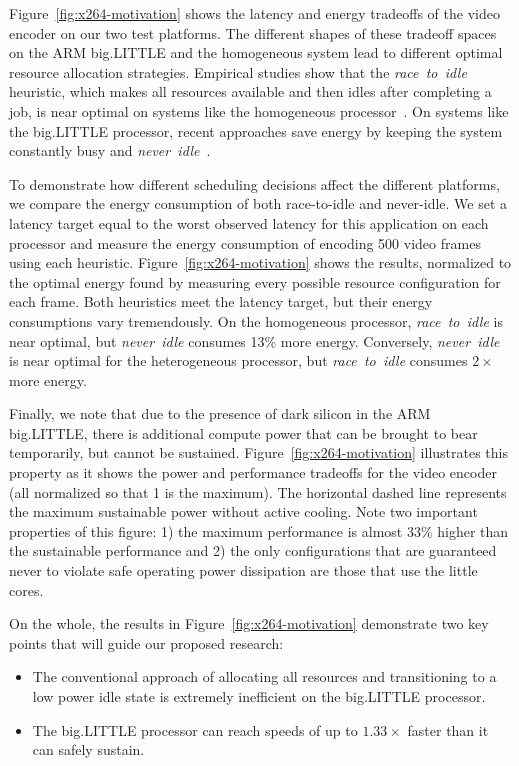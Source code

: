 Figure~\ref{fig:x264-motivation} shows the latency and energy
tradeoffs of the video encoder on our two test platforms.  The
different shapes of these tradeoff spaces on the ARM big.LITTLE and
the homogeneous system lead to different optimal resource allocation
strategies. Empirical studies show that the \emph{race~to~idle}
heuristic, which makes all resources available and then idles after
completing a job, is near optimal on systems like the homogeneous
processor~\cite{PowerSlope,Hoelzle2009,google2,Imes2014,HotPower}.  On
systems like the big.LITTLE processor, recent approaches save energy
by keeping the system constantly busy and
\emph{never~idle}~\cite{Carroll13,LeSueur11,Imes2014,HotPower}.

To demonstrate how different scheduling decisions affect the different
platforms, we compare the energy consumption of both race-to-idle and
never-idle.  We set a latency target equal to the worst observed
latency for this application on each processor and measure the energy
consumption of encoding 500 video frames using each heuristic.
Figure~\ref{fig:x264-motivation} shows the results, normalized to
the optimal energy found by measuring every possible resource
configuration for each frame.  Both heuristics meet the latency
target, but their energy consumptions vary tremendously. On the
homogeneous processor, \emph{race~to~idle} is near optimal, but
\emph{never~idle} consumes 13\% more energy.  Conversely,
\emph{never~idle} is near optimal for the heterogeneous processor, but
\emph{race~to~idle} consumes $2 \times$ more energy.

Finally, we note that due to the presence of dark silicon in the ARM
big.LITTLE, there is additional compute power that can be brought to
bear temporarily, but cannot be sustained.
Figure~\ref{fig:x264-motivation} illustrates this property as it
shows the power and performance tradeoffs for the video encoder (all
normalized so that 1 is the maximum).  The horizontal dashed line
represents the maximum sustainable power without active cooling.  Note
two important properties of this figure: 1) the maximum performance is
almost 33\% higher than the sustainable performance and 2) the only
configurations that are guaranteed never to violate safe operating
power dissipation are those that use the little cores.

On the whole, the results in Figure~\ref{fig:x264-motivation} demonstrate
two key points that will guide our proposed research:
\begin{itemize}
\item The conventional approach of allocating all resources and
transitioning to a low power idle state is extremely inefficient on
the big.LITTLE processor.  
\item The big.LITTLE processor can reach speeds of up to $1.33 \times$
  faster than it can safely sustain.
\end{itemize}
